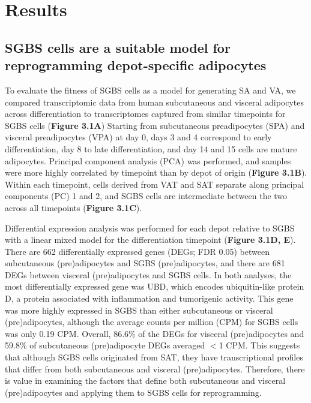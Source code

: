 \section{Results}

\subsection{SGBS cells are a suitable model for reprogramming depot-specific adipocytes}

To evaluate the fitness of SGBS cells as a model for generating SA and VA, we compared transcriptomic data from human subcutaneous and visceral adipocytes across differentiation\cite{Laber2023-qe} to transcriptomes captured from similar timepoints for SGBS cells\cite{DeForest2024-ex,Aldehoff2024-ts,Wachowski2024-bb}  (\textbf{Figure 3.1A}) Starting from subcutaneous preadipocytes (SPA) and visceral preadipocytes (VPA) at day 0, days 3 and 4 correspond to early differentiation, day 8 to late differentiation, and day 14 and 15 cells are mature adipocytes. Principal component analysis (PCA) was performed, and samples were more highly correlated by timepoint than by depot of origin (\textbf{Figure 3.1B}). Within each timepoint, cells derived from VAT and SAT separate along principal components (PC) 1 and 2, and SGBS cells are intermediate between the two across all timepoints (\textbf{Figure 3.1C}).

Differential expression analysis was performed for each depot relative to SGBS with a linear mixed model for the differentiation timepoint (\textbf{Figure 3.1D, E}). There are 662 differentially expressed genes (DEGs; FDR 0.05) between subcutaneous (pre)adipocytes and SGBS (pre)adipocytes, and there are 681 DEGs between visceral (pre)adipocytes and SGBS cells. In both analyses, the most differentially expressed gene was UBD, which encodes ubiquitin-like protein D, a protein associated with inflammation and tumorigenic activity\cite{Su2021-var}. This gene was more highly expressed in SGBS than either subcutaneous or visceral (pre)adipocytes, although the average counts per million (CPM) for SGBS cells was only 0.19 CPM. Overall, 86.6\% of the DEGs for visceral (pre)adipocytes and 59.8\% of subcutaneous (pre)adipocyte DEGs averaged $<$1 CPM. This suggests that although SGBS cells originated from SAT, they have transcriptional profiles that differ from both subcutaneous and visceral (pre)adipocytes. Therefore, there is value in examining the factors that define both subcutaneous and visceral (pre)adipocytes and applying them to SGBS cells for reprogramming.

